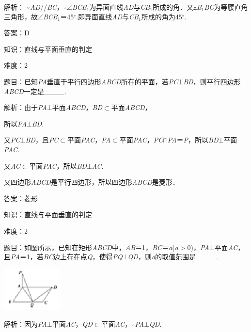 \documentclass{article} %
\begin{document}
解析：
$\mathrm{\because}$\textit{AD}//\textit{BC}，$\mathrm{\therefore}$$\mathrm{\angle}$\textit{BCB}${}_{1}$为异面直线\textit{AD}与\textit{CB}${}_{1}$所成的角．又$\mathrm{\vartriangle}$\textit{B}${}_{1}$\textit{BC}为等腰直角三角形，故$\mathrm{\angle}$\textit{BCB}${}_{1}$＝45$\mathrm{{}^\circ}$.即异面直线\textit{AD}与\textit{CB}${}_{1}$所成的角为45$\mathrm{{}^\circ}$.

答案：D

知识：直线与平面垂直的判定

难度：2

题目：已知\textit{PA}垂直于平行四边形\textit{ABCD}所在的平面，若\textit{PC}$\mathrm{\bot}$\textit{BD}，则平行四边形\textit{ABCD}一定是\_\_\_\_.

解析：由于\textit{PA}$\mathrm{\bot}$平面\textit{ABCD}，\textit{BD}$\mathrm{\subset }$平面\textit{ABCD}，

所以\textit{PA}$\mathrm{\bot}$\textit{BD}.

又\textit{PC}$\mathrm{\bot}$\textit{BD}，且\textit{PC}$\mathrm{\subset }$平面\textit{PAC}，\textit{PA}$\mathrm{\subset }$平面\textit{PAC}，\textit{PC}$\mathrm{\cap}$\textit{PA}＝\textit{P}，所以\textit{BD}$\mathrm{\bot}$平面\textit{PAC}.

又\textit{AC}$\mathrm{\subset }$平面\textit{PAC}，所以\textit{BD}$\mathrm{\bot}$\textit{AC}.

又四边形\textit{ABCD}是平行四边形，所以四边形\textit{ABCD}是菱形．

答案：菱形

知识：直线与平面垂直的判定

难度：2

题目：如图所示，已知在矩形\textit{ABCD}中，\textit{AB}＝1，\textit{BC}＝\textit{a}(\textit{a}$\mathrm{>}$0)，\textit{PA}$\mathrm{\bot}$平面\textit{AC}，且\textit{PA}＝1，若\textit{BC}边上存在点\textit{Q}，使得\textit{PQ}$\mathrm{\bot}$\textit{QD}，则\textit{a}的取值范围是\_\_\_\_.

\includegraphics*[width=1.22in, height=0.90in, keepaspectratio=false]{image204}

解析：因为\textit{PA}$\mathrm{\bot}$平面\textit{AC}，\textit{QD}$\mathrm{\subset }$平面\textit{AC}，$\mathrm{\therefore}$\textit{PA}$\mathrm{\bot}$\textit{QD}.
\end{document}
